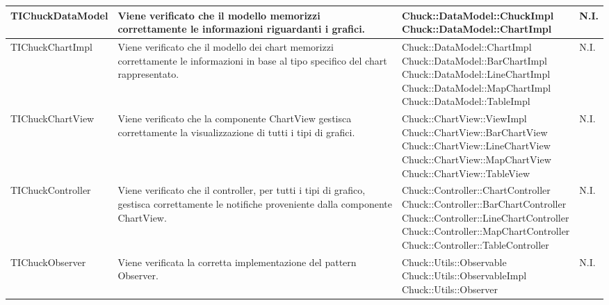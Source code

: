 \begin{table}[H]
\begin{center}
\begin{longtabu}{| p{0.30\textwidth} |p{0.24\textwidth} |p{0.35\textwidth} | p{0.05\textwidth} |}
	TIChuckDataModel
				&
Viene verificato che il modello memorizzi correttamente le informazioni riguardanti i grafici.
			& \parbox[t]{0.6\textwidth}{
Chuck::DataModel::ChuckImpl\\
Chuck::DataModel::ChartImpl}
			& N.I.
			\\ \hline



	TIChuckChartImpl
				&
Viene verificato che il modello dei chart memorizzi correttamente le informazioni in base al tipo specifico del chart rappresentato.
			& \parbox[t]{0.6\textwidth}{
Chuck::DataModel::ChartImpl\\
Chuck::DataModel::BarChartImpl\\
Chuck::DataModel::LineChartImpl\\
Chuck::DataModel::MapChartImpl\\
Chuck::DataModel::TableImpl}
			& N.I.
			\\ \hline



	TIChuckChartView
				&
Viene verificato che la componente ChartView gestisca correttamente la visualizzazione di tutti i tipi di grafici.
			& \parbox[t]{0.6\textwidth}{
Chuck::ChartView::ViewImpl\\
Chuck::ChartView::BarChartView\\
Chuck::ChartView::LineChartView\\
Chuck::ChartView::MapChartView\\
Chuck::ChartView::TableView}
			& N.I.
			\\ \hline



	TIChuckController
				&
Viene verificato che il controller, per tutti i tipi di grafico, gestisca correttamente le notifiche proveniente dalla componente ChartView.
			& \parbox[t]{0.6\textwidth}{
Chuck::Controller::ChartController\\
Chuck::Controller::BarChartController\\
Chuck::Controller::LineChartController\\
Chuck::Controller::MapChartController\\
Chuck::Controller::TableController}
			& N.I.
			\\ \hline



	TIChuckObserver &
Viene verificata la corretta implementazione del pattern Observer.
			& \parbox[t]{0.6\textwidth}{
Chuck::Utils::Observable\\
Chuck::Utils::ObservableImpl\\
Chuck::Utils::Observer}
			& N.I.
			\\ \hline










\end{longtabu}
\end{center}
\end{table}
